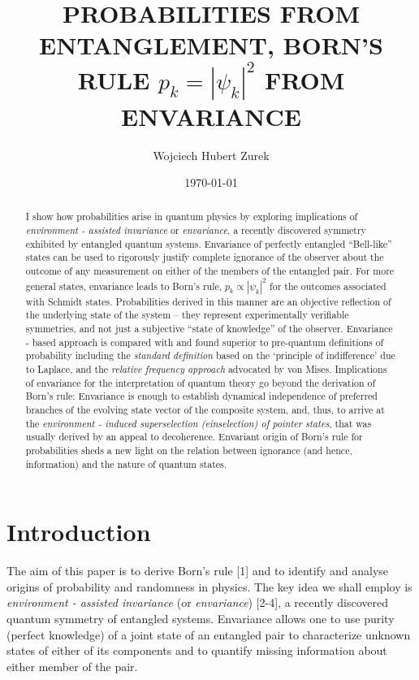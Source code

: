 \documentclass[aps,pra,epsfig,11pt,floatfix]{revtex4}
\begin{document}
\title{ PROBABILITIES FROM ENTANGLEMENT, BORN'S RULE $p_k=|\psi_k|^2$ FROM ENVARIANCE}
\author{Wojciech Hubert Zurek}

    \address{Theory Division, MS B210, LANL
    Los Alamos, NM, 87545, U.S.A.}

\date{\today}

\begin{abstract}
I show how probabilities arise in quantum physics by exploring implications
of {\it environment - assisted invariance} or {\it envariance},
a recently discovered symmetry exhibited by entangled quantum systems.
Envariance of perfectly entangled ``Bell-like'' states can be used to rigorously justify
complete ignorance of the observer about the outcome of any measurement
on either of the members of the entangled pair. For more general states, envariance 
leads to Born's rule, $p_k \propto |\psi_k|^2$ for the outcomes associated with
Schmidt states. Probabilities derived in this manner are an
objective reflection of the underlying state of the system -- they represent
experimentally verifiable symmetries, and not just a subjective ``state of
knowledge'' of the observer. Envariance - based approach is compared with
and found superior to pre-quantum definitions of probability including
the {\it standard definition} based on the `principle of indifference' due
to Laplace, and the {\it relative frequency approach} advocated by von Mises.
Implications of envariance for the interpretation of quantum theory go beyond
the derivation of Born's rule: Envariance is enough to establish dynamical
independence of preferred branches of the evolving state vector of
the composite system, and, thus, to arrive at the {\it environment - induced
superselection (einselection) of pointer states}, that was usually derived
by an appeal to decoherence. Envariant origin of Born's rule for probabilities
sheds a new light on the relation between ignorance (and hence, information)
and the nature of quantum states.
\end{abstract}
\maketitle
\section{Introduction}

The aim of this paper is to derive Born's rule [1] and to identify and analyse
origins of probability and randomness in physics. The key idea we shall employ
is {\it environment - assisted invariance} (or {\it envariance}) [2-4],
a recently discovered quantum symmetry of entangled systems.  Envariance
allows one to use purity (perfect knowledge) of a joint state of an entangled pair 
to characterize unknown states of either of its components and to quantify
missing information about either member of the pair.
\end{document}
